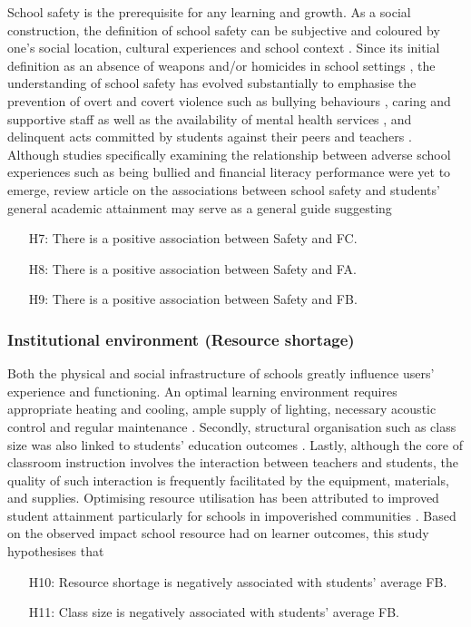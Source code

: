 School safety is the prerequisite for any learning and growth. As a social construction, the definition of school safety can be subjective and coloured by one's social location, cultural experiences and school context \citep{cornell:2010}. Since its initial definition as an absence of weapons and/or  homicides in school settings \citep{skiba:2006}, the understanding of school safety has evolved substantially to emphasise the prevention of overt and covert violence such as bullying behaviours \citep[physical safety,][]{jimerson:2012}, caring and supportive staff as well as the availability of mental health services \citep[emotional safety,][]{kuperminc:1997}, and delinquent acts committed by students against their peers and teachers \citep[school order and discipline,][]{gottfredson:2005}. Although studies specifically examining the relationship between adverse school experiences such as being bullied and financial literacy performance were yet to emerge,  review article on the associations between school safety and students' general academic attainment may serve as a general guide suggesting
\begin{itemize}
    \item[H7:] There is a positive association between Safety and FC.
    \item[H8:] There is a positive association between Safety and FA.
    \item[H9:] There is a positive association between Safety and FB.
\end{itemize}

\subsubsection{Institutional environment (Resource shortage)}

Both the physical and social infrastructure of schools greatly influence users' experience and functioning. An optimal learning environment requires appropriate heating and cooling, ample supply of lighting, necessary acoustic control and regular maintenance \citep[environmental adequacy,][]{uline:2008}. Secondly, structural organisation such as class size was also linked to students' education outcomes \citep{finn:1999}. Lastly, although the core of classroom instruction involves the interaction between teachers and students, the quality of such interaction is frequently facilitated by the equipment, materials, and supplies. Optimising resource utilisation has been attributed to improved student attainment particularly for schools in impoverished communities \citep{miles:1998}. Based on the observed impact school resource had on learner outcomes, this study hypothesises that
\begin{itemize}
    \item[H10:] Resource shortage is negatively associated with students' average FB.
    \item[H11:] Class size is negatively associated with students' average FB.
\end{itemize}

